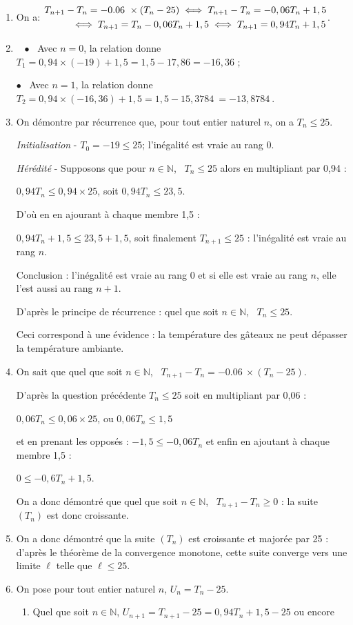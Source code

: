 \documentclass[10pt]{article}
\providecommand{\starredbullet}{\ensuremath{\bullet}}
\providecommand{\N}{\mathbb{N}}
\providecommand{\np}[2][]{{#2~#1}}
\begin{document}
\begin{enumerate}
\item 
On a: $\begin{gathered}T_{n+1}-T_n=-\np{0.06}\times \left(T_n - 25\right) \iff T_{n+1}-T_n = -0,06T_n  + 1,5 \\
\hspace*{1cm}\iff T_{n+1} =  T_n - 0,06T_n  + 1,5 \iff T_{n+1} =  0,94T_n  + 1,5\end{gathered}$.
\item ~
\starredbullet ~ Avec $n = 0$, la relation  donne $T_1 = 0,94 \times (- 19) + 1,5 = 1,5 - 17,86 = -16,36$ ;

\starredbullet ~ Avec $n = 1$, la relation  donne $T_2 = 0,94 \times (- 16,36) + 1,5 = 1,5 - \np{15,3784} = -\np{13,8784}$.
\item On démontre par récurrence que, pour tout entier naturel $n$, on a $T_n\leqslant 25$.


\emph{Initialisation} - $T_0 = - 19 \leqslant 25$; l'inégalité est vraie au rang $0$.

\emph{Hérédité} - Supposons que pour $n \in \N$, \, $T_n\leqslant 25$ alors en multipliant par 0,94 :

$0,94T_n \leqslant 0,94 \times 25$, soit $0,94T_n \leqslant  23,5$.

D'où en en ajourant à chaque membre 1,5 :

$0,94T_n  + 1,5 \leqslant 23,5 + 1,5$, soit finalement $T_{n+1} \leqslant 25$ : l'inégalité est vraie au rang $n$.

Conclusion : l'inégalité est vraie au rang $0$ et si elle est vraie au rang $n$, elle l'est aussi au rang $n + 1$.

D'après le principe de récurrence : quel que soit $n \in \N$, \, $T_n \leqslant 25$.

Ceci correspond à une évidence : la température des gâteaux ne peut dépasser la température ambiante.
\item 
On sait que quel que soit $n \in \N$, \, $T_{n+1}-T_n = -\np{0.06}\times \left(T_n - 25\right)$.

D'après la question précédente $T_n \leqslant 25$ soit en multipliant par 0,06 :

$0,06T_n \leqslant 0,06 \times 25$, ou $0,06T_n \leqslant 1,5$

et en prenant les opposés : $- 1,5 \leqslant - 0,06T_n$ et enfin en ajoutant à chaque membre 1,5 :

$0 \leqslant - 0,6T_n + 1,5$.

On a donc démontré que quel que soit $n \in \N$, \, $T_{n+1}-T_n  \geqslant 0$ : la suite $\left(T_n\right)$ est donc croissante.
\item 
On a donc démontré que la suite $\left(T_n\right)$ est croissante et majorée par 25 : d'après le théorème de la convergence monotone, cette suite converge vers une limite $\ell$ telle que $\ell \leqslant 25$.
\item On pose pour tout entier naturel $n$, $U_n = T_n - 25$.
\begin{enumerate}
\item 
Quel que soit $n \in \N$, $U_{n+1} = T_{n+1} - 25 = 0,94T_n + 1,5 - 25$ ou encore 


\end{enumerate}
\end{enumerate}
\end{document}
